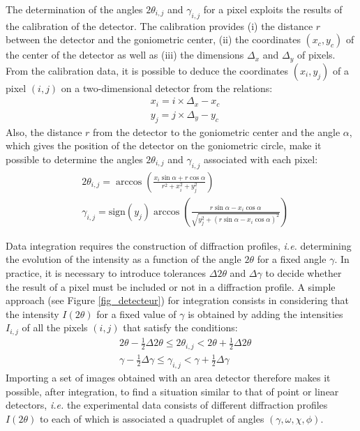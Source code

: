 \documentclass[french,a4paper]{report}
\begin{document}
The determination of the angles $2 \theta_{i,j}$ and $\gamma_{i,j}$ for a pixel exploits the results of the calibration of the detector. The calibration provides (i) the distance $r$ between the detector and the goniometric center, (ii) the coordinates $(x_c, y_c) $ of the center of the detector as well as (iii) the dimensions $\Delta_x$ and $\Delta_y$ of pixels. From the calibration data, it is possible to deduce the coordinates $(x_i,y_j)$ of a pixel $(i,j)$ on a two-dimensional detector from the relations:
\begin{align}
&x_{i}= i \times \Delta_x - x_c\\
&y_{j}= j \times \Delta_y-y_c
\end{align}
Also, the distance $r$ from the detector to the goniometric center and the angle $\alpha$, which gives the position of the detector on the goniometric circle, make it possible to determine the angles $2 \theta_{i,j}$ and $\gamma_ {i,j}$ associated with each pixel:
\begin{align}
&2 \theta_{i,j}  = \arccos \left( \frac{x_i \sin \alpha + r \cos \alpha}{r^2+x_i^2+y_j^2} \right) \\
&\gamma_{i,j}  = \text{sign} \left( y_{j}  \right)\arccos \left(  \frac{r \sin \alpha-x_{i} \cos \alpha }{\sqrt{y_{j}^2+(r \sin \alpha-x_{i} \cos \alpha)^2 }} \right)
\end{align}

Data integration requires the construction of diffraction profiles, \textit{i.e.} determining the evolution of the intensity as a function of the angle $2\theta$ for a fixed angle $\gamma$. In practice, it is necessary to introduce tolerances $\Delta 2 \theta$ and $\Delta \gamma$ to decide whether the result of a pixel must be included or not in a diffraction profile. A simple approach (see Figure \ref{fig_detecteur}) for integration consists in considering that the intensity $I (2 \theta )$ for a fixed value of $\gamma$ is obtained by adding the intensities $I_{ i,j}$ of all the pixels $(i,j)$ that satisfy the conditions:
\begin{align}
&2 \theta- \frac{1}{2} \Delta 2 \theta \leq 2 \theta_{i,j}  < 2 \theta+ \frac{1}{2} \Delta 2 \theta \\
&\gamma- \frac{1}{2} \Delta \gamma \leq \gamma_{i,j}  < \gamma+ \frac{1}{2} \Delta \gamma 
\end{align}
Importing a set of images obtained with an area detector therefore makes it possible, after integration, to find a situation similar to that of point or linear detectors, \textit{i.e.} the experimental data consists of different diffraction profiles $I (2 \theta )$ to each of which is associated a quadruplet of angles $(\gamma,\omega,\chi,\phi)$.
\end{document}
